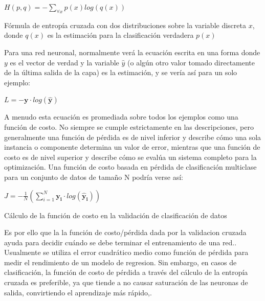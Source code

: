 			\begingroup\makeatletter{}\check@mathfonts
			\begin{center}
			$H(p,q) = -\sum_{\forall x} p(x) log(q(x))$
			\end{center}
			\begin{center}
			{\small{Fórmula de entropía cruzada con dos distribuciones sobre la variable discreta $x$, donde $q(x)$ es la estimación para la clasificación verdadera $p(x)$}}
			\end{center}
			\endgroup		

		Para una red neuronal, normalmente verá la ecuación escrita en una forma donde $y$ es el vector de verdad y la variable $\hat{y}$ (o algún otro valor tomado directamente de la última salida de la capa) es la estimación, y se vería así para un solo ejemplo:
			
			\begingroup\makeatletter{}\check@mathfonts
			\begin{center}
			$L = - \mathbf{y} \cdot log(\mathbf{\hat{y}})$
			\end{center}
			\endgroup		
		
		A menudo esta ecuación es promediada sobre todos los ejemplos como una función de costo. No siempre se cumple estrictamente en las descripciones, pero generalmente una función de pérdida es de nivel inferior y describe cómo una sola instancia o componente determina un valor de error, mientras que una función de costo es de nivel superior y describe cómo se evalúa un sistema completo para la optimización. Una función de costo basada en pérdida de clasificación multiclase para un conjunto de datos de tamaño N podría verse así:
		
			\begingroup\makeatletter{}\check@mathfonts
			\begin{center}
			$J = - \frac{1}{N}(\sum_{i=1}^{N} \mathbf{y_i} \cdot log(\mathbf{\hat{y}_i}))$
			\end{center}
			\begin{center}
			{\small{Cálculo de la función de costo en la validación de clasificación de datos}}
			\end{center}
			\endgroup		
	

		Es por ello que la la función de costo/pérdida dada por la validacion cruzada ayuda para decidir cuándo se debe terminar el entrenamiento de una red.\citep{AulaMLP}. Usualmente se utiliza el error cuadrático medio como función de pérdida para medir el rendimiento de un modelo de regresion. Sin embargo, en casos de clasificación, la función de costo de pérdida a través del cálculo de la entropía cruzada es preferible, ya que tiende a no causar saturación de las neuronas de salida, convirtiendo el aprendizaje más rápido,\citep{AulaDNN}.


